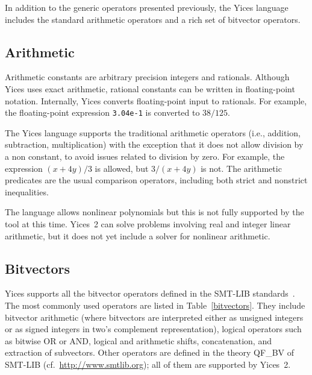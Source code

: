 \documentclass[11pt,twoside,fleqn,openright,titlepage]{cslreport}
\begin{document}
In addition  to the generic operators presented  previously, the Yices
language includes the standard arithmetic  operators and a rich set of
bitvector operators.

\subsection{Arithmetic}

Arithmetic constants  are arbitrary precision integers  and rationals.
Although  Yices  uses  exact  arithmetic, rational  constants  can  be
written  in  floating-point   notation.   Internally,  Yices  converts
floating-point input  to rationals.   For example,  the floating-point
expression \texttt{3.04e-1} is converted to $38/125$.

\medskip\noindent
The  Yices  language  supports  the traditional  arithmetic  operators
(i.e., addition, subtraction,  multiplication) with the exception that
it does not allow division by  a non constant, to avoid issues related
to  division by  zero. For  example, the  expression $(x  +  4y)/3$ is
allowed, but  $3/(x + 4y)$ is  not. The arithmetic  predicates are the
usual  comparison  operators,  including  both  strict  and  nonstrict
inequalities.

\medskip\noindent
The  language  allows nonlinear  polynomials  but  this  is not  fully
supported  by  the tool  at  this  time.  Yices~2 can  solve  problems
involving  real and  integer linear  arithmetic, but  it does  not yet
include a solver for nonlinear arithmetic.


\subsection{Bitvectors}
\label{bitvector-general}

Yices supports all the bitvector operators defined in the SMT-LIB
standards~\cite{SMTLIB12:2006,SMTLIB20:2012}.  The most commonly used
operators are listed in Table~\ref{bitvectors}.  They include
bitvector arithmetic (where bitvectors are interpreted either as
unsigned integers or as signed integers in two's complement
representation), logical operators such as bitwise OR or AND, logical
and arithmetic shifts, concatenation, and extraction of
subvectors. Other operators are defined in the theory QF\_BV of
SMT-LIB (cf.~\url{http://www.smtlib.org}); all of them are supported
by Yices~2.
\end{document}
